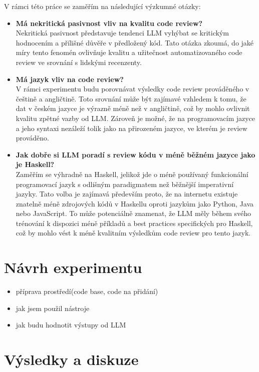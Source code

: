 \documentclass[12pt, a4paper]{article}
\begin{document}
V rámci této práce se zaměřím na následující výzkumné otázky:

\begin{itemize}
  \item \textbf{Má nekritická pasivnost vliv na kvalitu code review?}\\
  Nekritická pasivnost představuje tendenci LLM vyhýbat se kritickým hodnocením a přílišné důvěře v předložený kód. Tato otázka zkoumá, do jaké míry tento fenomén ovlivňuje kvalitu a užitečnost automatizovaného code review ve srovnání s lidskými recenzenty.
  
  \item \textbf{Má jazyk vliv na code review?}\\
  V rámci experimentu budu porovnávat výsledky code review prováděného v češtině a angličtině. Toto srovnání může být zajímavé vzhledem k tomu, že dat v českém jazyce je výrazně méně než v angličtině, což by mohlo ovlivnit kvalitu zpětné vazby od LLM. Zároveň je možné, že na programovacím jazyce a jeho syntaxi nezáleží tolik jako na přirozeném jazyce, ve kterém je review prováděno.
  
  \item \textbf{Jak dobře si LLM poradí s review kódu v méně běžném jazyce jako je Haskell?}\\
  Zaměřím se výhradně na Haskell, jelikož jde o méně používaný funkcionální programovací jazyk s odlišným paradigmatem než běžnější imperativní jazyky. Tato volba je zajímavá především proto, že na internetu existuje znatelně méně zdrojových kódů v Haskellu oproti jazykům jako Python, Java nebo JavaScript. To může potenciálně znamenat, že LLM měly během svého trénování k dispozici méně příkladů a best practices specifických pro Haskell, což by mohlo vést k méně kvalitním výsledkům code review pro tento jazyk.
\end{itemize}


\section{Návrh experimentu}

\begin{itemize}
  \item příprava prostředí(code base, code na přidání)
  \item jak jsem použil nástroje
  \item jak budu hodnotit výstupy od LLM
\end{itemize}

\section{Výsledky a diskuze}
\end{document}
